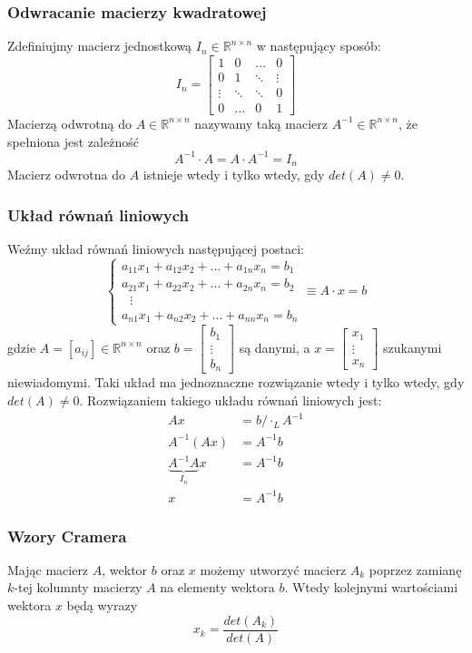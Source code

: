 \documentclass[a4paper,11pt]{article}
\begin{document}
\subsubsection{Odwracanie macierzy kwadratowej}
Zdefiniujmy macierz jednostkową $I_n \in \mathbb{R}^{n\times n}$ w następujący sposób:
$$
I_n = \left[
\begin{array}{cccc}
1		& 	0		& 	\ldots 		& 0 \\
0		& 	1		& 	\ddots		& \vdots \\
\vdots 	& 	\ddots	 	& 	\ddots		& 0 \\
0		& 	\ldots		& 	0 		& 1 
\end{array}
\right]
$$
\noindent Macierzą odwrotną do $A \in \mathbb{R}^{n\times n}$ nazywamy taką macierz $A^{-1} \in \mathbb{R}^{n\times n}$, że spełniona jest zależność
$$  A^{-1} \cdot A = A \cdot A^{-1} = I_n$$
\noindent Macierz odwrotna do $A$ istnieje wtedy i tylko wtedy, gdy $det(A)\neq 0$.

\subsubsection{Układ równań liniowych}
Weźmy układ równań liniowych następującej postaci:
$$
\begin{cases}
a_{11}x_{1}+a_{12}x_{2}+\dots+a_{1n}x_{n}= b_1 \\
a_{21}x_{1}+a_{22}x_{2}+\dots+a_{2n}x_{n}= b_2 \\
\ \ \ \vdots \\
a_{n1}x_{1}+a_{n2}x_{2}+\dots+a_{nn}x_{n}= b_n
\end{cases}
\equiv A\cdot x = b
$$
\noindent gdzie $A=\left[ a_{ij} \right] \in \mathbb{R}^{n\times n}$ oraz $b = \left[ \substack{b_1 \\ \vdots \\ b_n} \right]$ są danymi, a $x = \left[ \substack{x_1 \\ \vdots \\ x_n} \right]$ szukanymi niewiadomymi. Taki układ ma jednoznaczne rozwiązanie wtedy i tylko wtedy, gdy $det(A)\neq 0$. Rozwiązaniem takiego układu równań liniowych jest:
\begin{align*}
Ax &= b  /\cdot_{L} A^{-1} \\
A^{-1}(Ax) &= A^{-1}b \\
\underbrace{A^{-1}A}_{I_n}x &= A^{-1}b \\
x &= A^{-1}b
\end{align*}

\subsubsection{Wzory Cramera}
Mając macierz $A$, wektor $b$ oraz $x$ możemy utworzyć macierz $A_k$ poprzez zamianę $k$-tej kolumnty macierzy $A$ na elementy wektora $b$. Wtedy kolejnymi wartościami wektora $x$ będą wyrazy
$$ x_k = \frac{det(A_k)}{det(A)}$$ 
\end{document}
